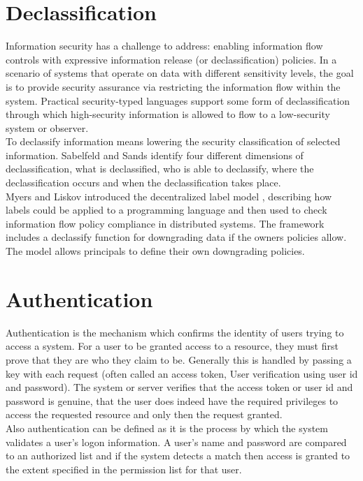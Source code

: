 \section{Declassification}
Information security has a challenge to address: enabling information flow controls with expressive information release (or declassification) policies. In a scenario of systems that operate on data with different sensitivity levels, the goal is to provide security assurance via restricting the information flow within the system. Practical security-typed languages support some form of declassification through which high-security information is allowed to flow to a low-security system or observer.\\

To declassify information means lowering the security classification of selected information. Sabelfeld and Sands \cite{ref_3_sabelfeld2009declassification} identify four different dimensions of declassification, what is declassified, who is able to declassify, where the declassification occurs and when the declassification takes place.\\

Myers and Liskov introduced the decentralized label model \cite{ref_4_myers2000protecting}, describing how labels could be applied
to a programming language and then used to check information
flow policy compliance in distributed systems. The framework
includes a declassify function for downgrading data if the
owners policies allow. The model allows principals to define their own downgrading policies.\\


\section{Authentication}
Authentication is the mechanism which confirms the identity of users trying to access a system. For a user to be granted access to a resource, they must first prove that they are who they claim to be. Generally this is handled by passing a key with each request (often called an access token, User verification using user id and password). The system or server verifies that the access token or user id and password is genuine, that the user does indeed have the required privileges to access the requested resource and only then the request granted.\\
Also authentication can be defined as it is the process by which the system validates a user's logon information. A user's name and password are compared to an authorized list and if the system detects a match then access is granted to the extent specified in the permission list for that user.\\

